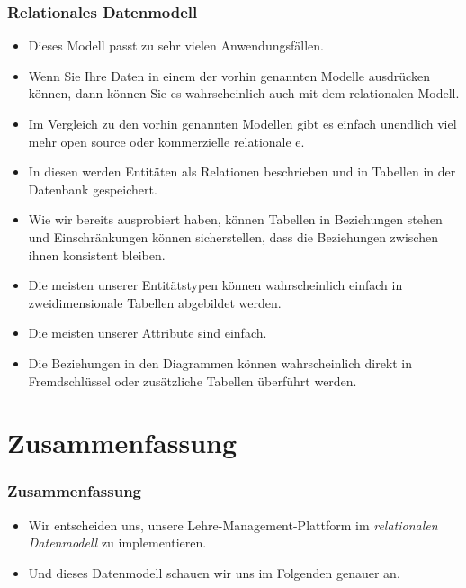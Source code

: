 \documentclass[aspectratio=169,mathserif,notheorems]{beamer}%
\begin{document}
%
%
\begin{frame}%
\frametitle{Relationales Datenmodell}%
\begin{itemize}%
%
%
\item<2-> Dieses Modell passt zu sehr vielen Anwendungsfällen.%
%
\item<3-> Wenn Sie Ihre Daten in einem der vorhin genannten Modelle ausdrücken können, dann können Sie es wahrscheinlich auch mit dem relationalen Modell.%
%
\item<4-> Im Vergleich zu den vorhin genannten Modellen gibt es einfach unendlich viel mehr open source oder kommerzielle relationale e.%
%
\item<5-> In diesen werden Entitäten als Relationen beschrieben und in Tabellen in der Datenbank gespeichert.%
%
\item<6-> Wie wir bereits ausprobiert haben, können Tabellen in Beziehungen stehen und Einschränkungen können sicherstellen, dass die Beziehungen zwischen ihnen konsistent bleiben.%
%
\item<7-> Die meisten unserer Entitätstypen können wahrscheinlich einfach in zweidimensionale Tabellen abgebildet werden.%
%
\item<8-> Die meisten unserer Attribute sind einfach.%
%
\item<9-> Die Beziehungen in den Diagrammen können wahrscheinlich direkt in Fremdschlüssel oder zusätzliche Tabellen überführt werden.%
%
\end{itemize}%
\end{frame}%
%
\section{Zusammenfassung}%
%
\begin{frame}%
\frametitle{Zusammenfassung}%
\begin{itemize}%
\item Wir entscheiden uns, unsere Lehre-Management-Plattform im \emph{relationalen Datenmodell} zu implementieren.%
\item<2-> Und dieses Datenmodell schauen wir uns im Folgenden genauer an.%
\end{itemize}%
\end{frame}%
%
\endPresentation%
\end{document}
